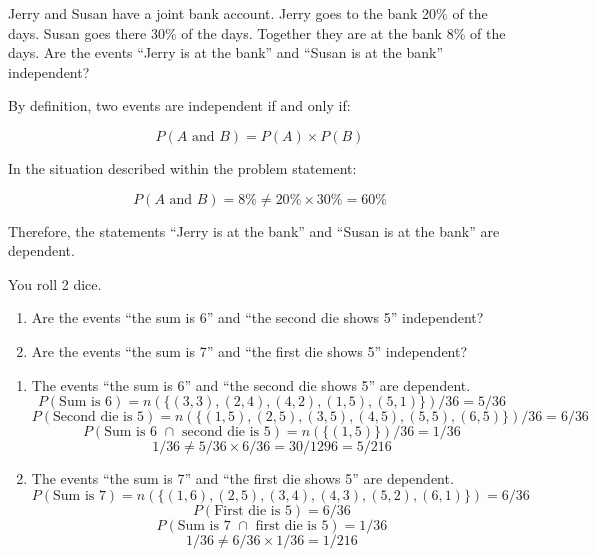 \documentclass{homework}
\begin{document}
\begin{problem}[3]
    Jerry and Susan have a joint bank account. Jerry goes to the bank 20\% of the days. Susan goes there 30\% of the days. Together they are at the bank 8\% of the days. Are the events ``Jerry is at the bank'' and ``Susan is at the bank'' independent?
\end{problem}

\begin{solution}
    By definition, two events are independent if and only if: 

    \begin{equation}
        P(A\text{ and } B) = P(A) \times P(B)
    \end{equation}

    In the situation described within the problem statement: 
    
    $$
        P(A\text{ and } B) = 8 \% \neq 20 \% \times 30 \% = 60 \%
    $$ 

    Therefore, the statements ``Jerry is at the bank'' and ``Susan is at the bank'' are dependent.
\end{solution}

\newpage 

\begin{problem}[4]
    You roll 2 dice. 
    \begin{enumerate}[label=\alph*.]
        \item Are the events ``the sum is 6'' and ``the second die shows 5'' independent?
        \item Are the events ``the sum is 7'' and ``the first die shows 5'' independent?
    \end{enumerate}
\end{problem}

\begin{solution}
    \begin{enumerate}[label=\alph*.]
        \item The events ``the sum is 6'' and ``the second die shows 5'' are dependent. 
        $$
        P(\text{Sum is 6}) = n(\{(3,3), (2,4), (4,2), (1,5), (5,1)\})/36 = 5/36
        $$
        $$
        P(\text{Second die is 5}) = n(\{(1,5), (2,5), (3,5), (4,5), (5,5), (6,5)\})/36 = 6/36
        $$
        $$
        P(\text{Sum is 6 $\cap$ second die is 5}) = n(\{(1,5)\})/36 = 1/36
        $$
        $$
        1/36 \neq 5/36 \times 6/36 = 30/1296 = 5/216
        $$

        \item The events ``the sum is 7'' and ``the first die shows 5'' are dependent.
        $$
        P(\text{Sum is 7}) = n(\{(1,6), (2,5), (3,4), (4,3), (5,2), (6,1)\}) = 6/36
        $$
        $$
        P(\text{First die is 5}) = 6/36
        $$
        $$
        P(\text{Sum is 7 $\cap$ first die is 5}) = 1/36
        $$
        $$
        1/36 \neq 6/36 \times 1/36 = 1/216
        $$
    \end{enumerate}

\end{solution}
\end{document}
